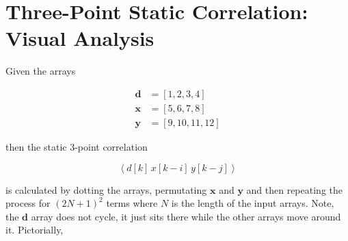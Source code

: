 \documentclass{article}
\begin{document}
\section{Three-Point Static Correlation: Visual Analysis}
Given the arrays

\begin{align}
    \mathbf{d} &= [1, 2, 3, 4] \nonumber \\
    \mathbf{x} &= [5, 6, 7, 8] \nonumber \\
    \mathbf{y} &= [9, 10, 11, 12] 
\end{align}

then the static 3-point correlation

\begin{equation}
    \left<d[k]\,x[k-i]\,y[k-j]\right>
\end{equation}

is calculated by dotting the arrays, permutating $\mathbf{x}$ and
$\mathbf{y}$ and then repeating the process for $(2N+1)^2$ terms
where $N$ is the length of the input arrays. Note, the $\mathbf{d}$
array does not cycle, it just sits there while the other arrays move
around it. Pictorially,
\end{document}

